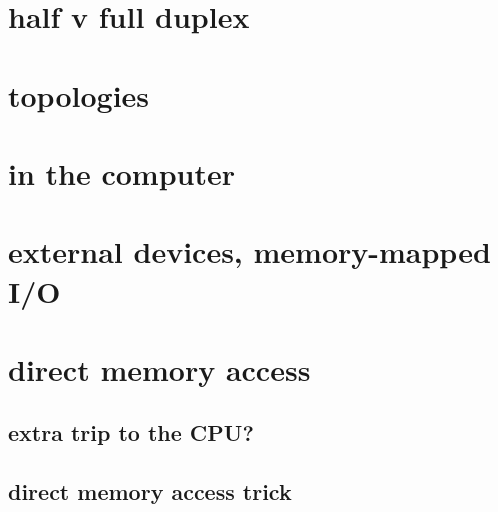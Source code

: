 
\section{half v full duplex}



\section{topologies}




\section{in the computer}



\section{external devices, memory-mapped I/O}

\section{direct memory access}

\subsection{extra trip to the CPU?}



\subsection{direct memory access trick}


